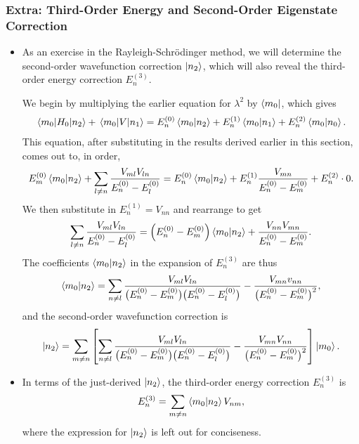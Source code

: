 \documentclass[11pt, a4paper]{article}
\newcommand{\Schro}{Schr\"{o}dinger\xspace}
\begin{document}
\subsubsection{Extra: Third-Order Energy and Second-Order Eigenstate Correction}
\begin{itemize}
    \item As an exercise in the Rayleigh-\Schro method, we will determine the second-order wavefunction correction $ \ket{n_{2}} $, which will also reveal the third-order energy correction $ E_{n}^{(3)} $. 

    We begin by multiplying the earlier equation for $ \lambda^{2} $ by $ \bra{m_{0}} $, which gives
    \begin{align*}
        \mel{m_{0}}{H_{0}}{n_{2}} + \mel{m_{0}}{V}{n_{1}} = E_{n}^{(0)} \braket{m_{0}}{n_{2}} + E_{n}^{(1)} \braket{m_{0}}{n_{1}} + E_{n}^{(2)}\braket{m_{0}}{n_{0}}.
    \end{align*}
    This equation, after substituting in the results derived earlier in this section, comes out to, in order,
    \begin{equation*}
        E_{m}^{(0)}\braket{m_{0}}{n_{2}} + \sum_{l \neq n}\frac{V_{ml}V_{ln}}{E_{n}^{(0)} - E_{l}^{(0)}} = E_{n}^{(0)}\braket{m_{0}}{n_{2}} + E_{n}^{(1)} \frac{V_{mn}}{E_{n}^{(0)} - E_{m}^{(0)}} + E_{n}^{(2)}\cdot 0.
    \end{equation*}
    We then substitute in $ E_{n}^{(1)} = V_{nn} $ and rearrange to get
    \begin{equation*}
        \sum_{l \neq n} \frac{V_{ml}V_{ln}}{E_{n}^{(0)} - E_{l}^{(0)}} = \left( E_{n}^{(0)} - E_{m}^{(0)} \right)\braket{m_{0}}{n_{2}} + \frac{V_{nn}V_{mn}}{E_{n}^{(0)} - E_{m}^{(0)}}.
    \end{equation*}
    The coefficients $ \braket{m_{0}}{n_{2}} $ in the expansion of $ E_{n}^{(3)} $ are thus
    \begin{equation*}
        \braket{m_{0}}{n_{2}} = \sum_{n \neq l} \frac{V_{ml}V_{ln}}{\big( E_{n}^{(0)} - E_{m}^{(0)} \big)\big( E_{n}^{(0)} - E_{l}^{(0)} \big)} - \frac{V_{mn}v_{nn}}{\big( E_{n}^{(0)} - E_{m}^{(0)} \big)^{2}},
    \end{equation*}
    and the second-order wavefunction correction is
    \begin{equation*}
        \ket{n_{2}} = \sum_{m \neq n} \left[ \sum_{n \neq l} \frac{V_{ml}V_{ln}}{\big( E_{n}^{(0)} - E_{m}^{(0)} \big)\big( E_{n}^{(0)} - E_{l}^{(0)} \big)} - \frac{V_{mn}V_{nn}}{\big( E_{n}^{(0)} - E_{m}^{(0)} \big)^{2}}  \right] \ket{m_{0}}.
    \end{equation*}

    \item In terms of the just-derived $ \ket{n_{2}} $, the third-order energy correction $ E_{n}^{(3)} $ is
    \begin{equation*}
        E_{n}^{(3)} = \sum_{m \neq n} \braket{m_{0}}{n_{2}} V_{nm},
    \end{equation*}
    where the expression for $ \ket{n_{2}} $ is left out for conciseness.
    
\end{itemize}
\end{document}
